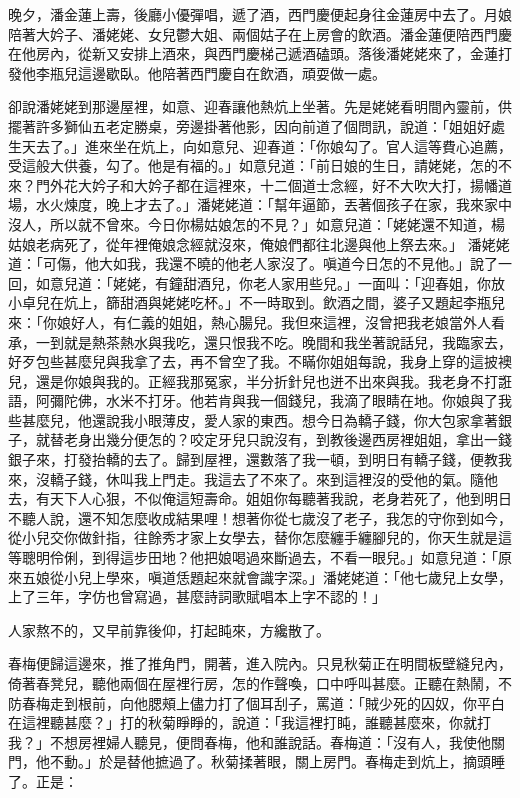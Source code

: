 晚夕，潘金蓮上壽，後廳小優彈唱，遞了酒，西門慶便起身往金蓮房中去了。月娘陪著大妗子、潘姥姥、女兒鬱大姐、兩個姑子在上房會的飲酒。潘金蓮便陪西門慶在他房內，從新又安排上酒來，與西門慶梯己遞酒磕頭。落後潘姥姥來了，金蓮打發他李瓶兒這邊歇臥。他陪著西門慶自在飲酒，頑耍做一處。

卻說潘姥姥到那邊屋裡，如意、迎春讓他熱炕上坐著。先是姥姥看明間內靈前，供擺著許多獅仙五老定勝桌，旁邊掛著他影，因向前道了個問訊，說道：「姐姐好處生天去了。」進來坐在炕上，向如意兒、迎春道：「你娘勾了。官人這等費心追薦，受這般大供養，勾了。他是有福的。」如意兒道：「前日娘的生日，請姥姥，怎的不來？門外花大妗子和大妗子都在這裡來，十二個道士念經，好不大吹大打，揚幡道場，水火煉度，晚上才去了。」潘姥姥道：「幫年逼節，丟著個孩子在家，我來家中沒人，所以就不曾來。今日你楊姑娘怎的不見？」如意兒道：「姥姥還不知道，楊姑娘老病死了，從年裡俺娘念經就沒來，俺娘們都往北邊與他上祭去來。」 潘姥姥道：「可傷，他大如我，我還不曉的他老人家沒了。嗔道今日怎的不見他。」說了一回，如意兒道：「姥姥，有鐘甜酒兒，你老人家用些兒。」一面叫：「迎春姐，你放小卓兒在炕上，篩甜酒與姥姥吃杯。」不一時取到。飲酒之間，婆子又題起李瓶兒來：「你娘好人，有仁義的姐姐，熱心腸兒。我但來這裡，沒曾把我老娘當外人看承，一到就是熱茶熱水與我吃，還只恨我不吃。晚間和我坐著說話兒，我臨家去，好歹包些甚麼兒與我拿了去，再不曾空了我。不瞞你姐姐每說，我身上穿的這披襖兒，還是你娘與我的。正經我那冤家，半分折針兒也迸不出來與我。我老身不打誑語，阿彌陀佛，水米不打牙。他若肯與我一個錢兒，我滴了眼睛在地。你娘與了我些甚麼兒，他還說我小眼薄皮，愛人家的東西。想今日為轎子錢，你大包家拿著銀子，就替老身出幾分便怎的？咬定牙兒只說沒有，到教後邊西房裡姐姐，拿出一錢銀子來，打發抬轎的去了。歸到屋裡，還數落了我一頓，到明日有轎子錢，便教我來，沒轎子錢，休叫我上門走。我這去了不來了。來到這裡沒的受他的氣。隨他去，有天下人心狠，不似俺這短壽命。姐姐你每聽著我說，老身若死了，他到明日不聽人說，還不知怎麼收成結果哩！想著你從七歲沒了老子，我怎的守你到如今，從小兒交你做針指，往餘秀才家上女學去，替你怎麼纏手纏腳兒的，你天生就是這等聰明伶俐，到得這步田地？他把娘喝過來斷過去，不看一眼兒。」如意兒道：「原來五娘從小兒上學來，嗔道恁題起來就會識字深。」潘姥姥道：「他七歲兒上女學，上了三年，字仿也曾寫過，甚麼詩詞歌賦唱本上字不認的！」

人家熬不的，又早前靠後仰，打起盹來，方纔散了。

春梅便歸這邊來，推了推角門，開著，進入院內。只見秋菊正在明間板壁縫兒內，倚著春凳兒，聽他兩個在屋裡行房，怎的作聲喚，口中呼叫甚麼。正聽在熱鬧，不防春梅走到根前，向他腮頰上儘力打了個耳刮子，罵道：「賊少死的囚奴，你平白在這裡聽甚麼？」打的秋菊睜睜的，說道：「我這裡打盹，誰聽甚麼來，你就打我？」不想房裡婦人聽見，便問春梅，他和誰說話。春梅道：「沒有人，我使他關門，他不動。」於是替他摭過了。秋菊揉著眼，關上房門。春梅走到炕上，摘頭睡了。正是：

